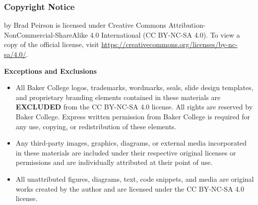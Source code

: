 \begin{frame}
    \frametitle{Copyright Notice}

    
    {\footnotesize
    \PresTitle {} by Brad Peirson is licensed under Creative Commons Attribution-NonCommercial-ShareAlike 4.0 International (CC BY-NC-SA 4.0). To view a copy of the official license, visit \href{https://creativecommons.org/licenses/by-nc-sa/4.0/}{https://creativecommons.org/licenses/by-nc-sa/4.0/}.

    \vspace{0.5em}

    \textbf{Exceptions and Exclusions}

    \begin{itemize}
        \item[Baker College Branding \& Trademarks:]All Baker College logos, trademarks, wordmarks, seals, slide design templates, and proprietary branding elements contained in these materials are \textbf{EXCLUDED} from the CC BY-NC-SA 4.0 license. All rights are reserved by Baker College. Express written permission from Baker College is required for any use, copying, or redistribution of these elements.
        \item[Third-Party Media \& Content:] Any third-party images, graphics, diagrams, or external media incorporated in these materials are included under their respective original licenses or permissions and are individually attributed at their point of use. 
        \item[Original Author Content:] All unattributed figures, diagrams, text, code snippets, and media are original works created by the author and are licensed under the CC BY-NC-SA 4.0 license.
    \end{itemize}
    \par}
\end{frame}




